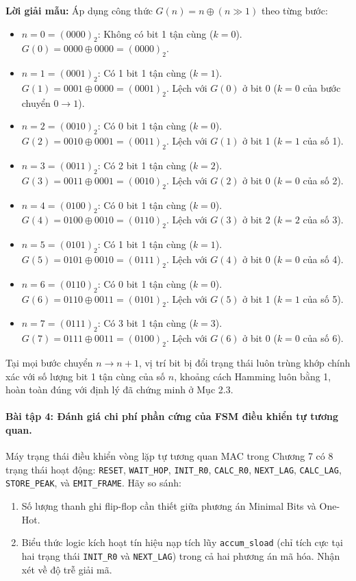 \textbf{Lời giải mẫu:}
Áp dụng công thức $G(n) = n \oplus (n \gg 1)$ theo từng bước:
\begin{itemize}[leftmargin=1.5em, itemsep=2pt]
    \item $n = 0 = (0000)_2$: Không có bit 1 tận cùng ($k = 0$). $G(0) = 0000 \oplus 0000 = (0000)_2$.
    \item $n = 1 = (0001)_2$: Có 1 bit 1 tận cùng ($k = 1$). $G(1) = 0001 \oplus 0000 = (0001)_2$. Lệch với $G(0)$ ở bit 0 ($k=0$ của bước chuyển $0 \to 1$).
    \item $n = 2 = (0010)_2$: Có 0 bit 1 tận cùng ($k = 0$). $G(2) = 0010 \oplus 0001 = (0011)_2$. Lệch với $G(1)$ ở bit 1 ($k=1$ của số 1).
    \item $n = 3 = (0011)_2$: Có 2 bit 1 tận cùng ($k = 2$). $G(3) = 0011 \oplus 0001 = (0010)_2$. Lệch với $G(2)$ ở bit 0 ($k=0$ của số 2).
    \item $n = 4 = (0100)_2$: Có 0 bit 1 tận cùng ($k = 0$). $G(4) = 0100 \oplus 0010 = (0110)_2$. Lệch với $G(3)$ ở bit 2 ($k=2$ của số 3).
    \item $n = 5 = (0101)_2$: Có 1 bit 1 tận cùng ($k = 1$). $G(5) = 0101 \oplus 0010 = (0111)_2$. Lệch với $G(4)$ ở bit 0 ($k=0$ của số 4).
    \item $n = 6 = (0110)_2$: Có 0 bit 1 tận cùng ($k = 0$). $G(6) = 0110 \oplus 0011 = (0101)_2$. Lệch với $G(5)$ ở bit 1 ($k=1$ của số 5).
    \item $n = 7 = (0111)_2$: Có 3 bit 1 tận cùng ($k = 3$). $G(7) = 0111 \oplus 0011 = (0100)_2$. Lệch với $G(6)$ ở bit 0 ($k=0$ của số 6).
\end{itemize}
Tại mọi bước chuyển $n \to n+1$, vị trí bit bị đổi trạng thái luôn trùng khớp chính xác với số lượng bit 1 tận cùng của số $n$, khoảng cách Hamming luôn bằng 1, hoàn toàn đúng với định lý đã chứng minh ở Mục 2.3.

\paragraph{Bài tập 4: Đánh giá chi phí phần cứng của FSM điều khiển tự tương quan.}
Máy trạng thái điều khiển vòng lặp tự tương quan MAC trong Chương 7 có 8 trạng thái hoạt động: \texttt{RESET}, \texttt{WAIT\_HOP}, \texttt{INIT\_R0}, \texttt{CALC\_R0}, \texttt{NEXT\_LAG}, \texttt{CALC\_LAG}, \texttt{STORE\_PEAK}, và \texttt{EMIT\_FRAME}. Hãy so sánh:
\begin{enumerate}[label=(\alph*)]
    \item Số lượng thanh ghi flip-flop cần thiết giữa phương án Minimal Bits và One-Hot.
    \item Biểu thức logic kích hoạt tín hiệu nạp tích lũy \texttt{accum\_sload} (chỉ tích cực tại hai trạng thái \texttt{INIT\_R0} và \texttt{NEXT\_LAG}) trong cả hai phương án mã hóa. Nhận xét về độ trễ giải mã.
\end{enumerate}

